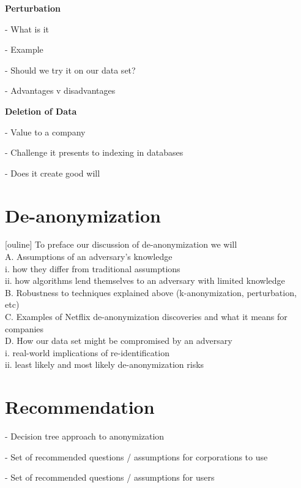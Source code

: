 \documentclass[10pt,journal,compsoc]{IEEEtran}
\begin{document}
\noindent \textbf{Perturbation}

-	What is it

-	Example

-	Should we try it on our data set?

-	Advantages v disadvantages

\noindent \textbf{Deletion of Data}

-	Value to a company

-	Challenge it presents to indexing in databases

-	Does it create good will


\section{De-anonymization}
[ouline] To preface our discussion of de-anonymization we will\\

\noindent A. Assumptions of an adversary's knowledge\\
\indent i. how they differ from traditional assumptions\\
\indent ii. how algorithms lend themselves to an adversary with limited knowledge\\
\noindent B. Robustness to techniques explained above (k-anonymization, perturbation, etc)\\
\noindent C. Examples of Netflix de-anonymization discoveries and what it means for companies\\
\noindent D. How our data set might be compromised by an adversary\\
\indent i. real-world implications of re-identification\\
\indent ii. least likely and most likely de-anonymization risks\\
\section{Recommendation}

-	Decision tree approach to anonymization

-	Set of recommended questions / assumptions for corporations to use

-	Set of recommended questions / assumptions for users
\end{document}
